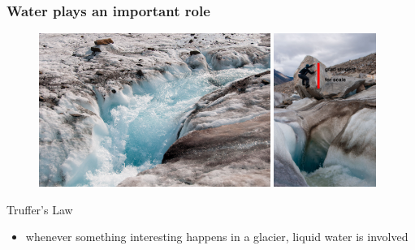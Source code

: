 \documentclass[hide notes,intlimits,unknownkeysallowed]{beamer}
\begin{document}
{
%
} 



\begin{frame}
  \frametitle{Water plays an important role}
  \begin{figure}
    \includegraphics[height=5cm]{black-rapids-1} \vspace{0.25em}
    \includegraphics[height=5cm]{black-rapids-2}
  \end{figure}
  \begin{block}{Truffer's Law}
    \begin{itemize}
    \item whenever something interesting happens in a glacier, liquid water is involved
    \end{itemize}
  \end{block}
\end{frame}

  {
} 
\end{document}

